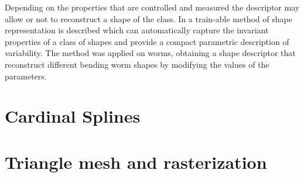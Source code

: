 Depending on the properties that are controlled and measured the descriptor
may allow or not to reconstruct a shape of the class. In \cite{wormparam} 
a train-able method of shape representation is described which can
automatically capture the invariant properties of a class of shapes and 
provide a compact parametric description of variability. The method was
applied on worms, obtaining a shape descriptor that reconstruct different
bending worm shapes by modifying the values of the parameters.\\


\section{Cardinal Splines}
\label{sec:splines}

\section{Triangle mesh and rasterization}
\label{sec:triangle}


